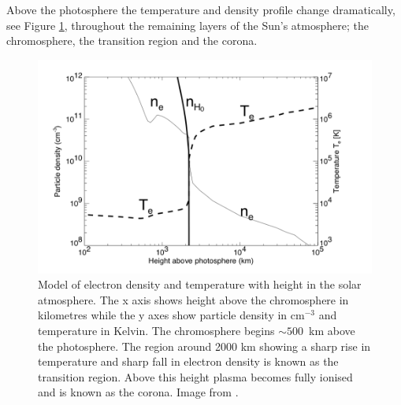 Above the photosphere the temperature and density profile change dramatically, see Figure \ref{fig:corona_temp}, throughout the remaining layers of the Sun's atmosphere; the chromosphere, the transition region and the corona. 
\begin{figure}[ht]
    \centering
    \includegraphics[width=\columnwidth]{Images/Corona_temp.png}
    \caption[Model of electron density and temperature with height in the solar atmosphere.]{Model of electron density and temperature with height in the solar atmosphere. The x axis shows height above the chromosphere in kilometres while the y axes show particle density in cm$^{-3}$ and temperature in Kelvin. The chromosphere begins $\sim 500$~km above the photosphere. The region around 2000 km showing a sharp rise in temperature and sharp fall in electron density is known as the transition region. Above this height plasma becomes fully ionised and is known as the corona. Image from \cite{Aschwanden2004}.}
    \label{fig:corona_temp}
\end{figure}

